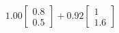 \documentclass[preview]{standalone}
\begin{document}
\begin{align*}
1.00 \begin{bmatrix} 0.8 \\ 0.5 \end{bmatrix} + 0.92 \begin{bmatrix} 1 \\ 1.6 \end{bmatrix}
\end{align*}
\end{document}
